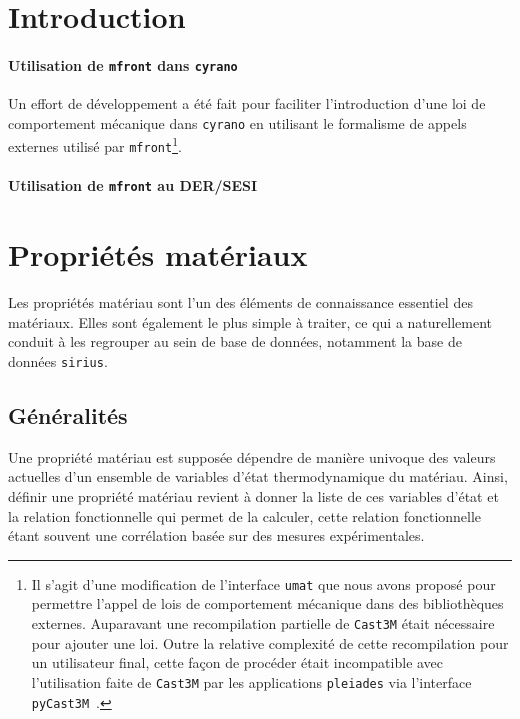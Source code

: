 \documentclass[12pt]{article}
\newcommand{\pleiades}{\texttt{pleiades}}
\newcommand{\mfront}{\texttt{mfront}}
\newcommand{\cyrano}{\texttt{cyrano}}
\newcommand{\castem}{\texttt{Cast3M}}
\newcommand{\pycastem}{\texttt{pyCast3M}}
\newcommand{\umat}{\texttt{umat}}
\newcommand{\sirius}{\texttt{sirius}}
\begin{document}
\section{Introduction}

\paragraph{Utilisation de \mfront{} dans \cyrano{}}

Un effort de développement a été fait pour faciliter l'introduction
d'une loi de comportement mécanique dans \cyrano{} en utilisant le
formalisme de appels externes utilisé par \mfront{}\footnote{Il s'agit
d'une modification de l'interface \umat{} que nous avons proposé pour
permettre l'appel de lois de comportement mécanique dans des
bibliothèques externes. Auparavant une recompilation partielle de
\castem{} était nécessaire pour ajouter une loi. Outre la relative
complexité de cette recompilation pour un utilisateur final, cette façon
de procéder était incompatible avec l'utilisation faite de \castem{} par
les applications \pleiades{} via l'interface
\pycastem~\cite{t.06:_implan}.}.

\paragraph{Utilisation de \mfront{} au DER/SESI}

\section{Propriétés matériaux}

Les propriétés matériau sont l'un des éléments de connaissance
essentiel des matériaux. Elles sont également le plus simple à
traiter, ce qui a naturellement conduit à les regrouper au sein de
base de données, notamment la base de données \sirius{}.

\subsection{Généralités}

Une propriété matériau est supposée dépendre de manière univoque des
valeurs actuelles d'un ensemble de variables d'état thermodynamique du
matériau. Ainsi, définir une propriété matériau revient à donner la
liste de ces variables d'état et la relation fonctionnelle qui permet
de la calculer, cette relation fonctionnelle étant souvent une
corrélation basée sur des mesures expérimentales.
\end{document}
